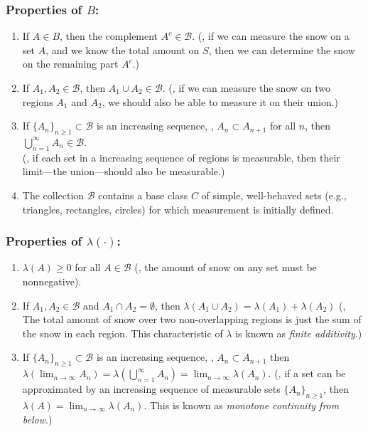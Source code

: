 \subsubsection*{Properties of $B$:}
\begin{enumerate}
    \item If $A \in B$, then the complement $A^c \in \mathcal{B}$. (\ie, if we can measure the snow on a set $A$, and we know the total amount on $S$, then we can determine the snow on the remaining part $A^c$.)
    \item If $A_1, A_2 \in \mathcal{B}$, then \(A_1 \cup A_2 \in \mathcal{B}\).  
    (\ie, if we can measure the snow on two regions \(A_1\) and \(A_2\), we should also be able to measure it on their union.)
    \item If $\{A_n\}_{n \geq 1} \subset \mathcal{B}$ is an increasing sequence, \ie, $A_n \subset A_{n+1}$ for all $n$, then $\bigcup_{n=1}^{\infty} A_n \in \mathcal{B}$.  
    \\(\ie, if each set in a increasing sequence of regions is measurable, then their limit—the union—should also be measurable.)
    \item The collection $\mathcal{B}$ contains a base class $C$ of simple, well-behaved sets (e.g., triangles, rectangles, circles) for which measurement is initially defined.
\end{enumerate}

\subsubsection*{Properties of $\lambda (\cdot)$:}
\begin{enumerate}
    \item  $\lambda(A) \geq 0$ for all $A \in \mathcal{B}$ (\ie, the amount of snow on any set must be nonnegative). 
    \item If $A_1, A_2 \in \mathcal{B}$ and $A_1 \cap A_2 = \emptyset$, then  
    $\lambda(A_1 \cup A_2) = \lambda(A_1) + \lambda(A_2)$
 (\ie, The total amount of snow over two non-overlapping regions is just the sum of the snow in each region. This characteristic of 
$\lambda$ is known as \emph{finite additivity}.)
    \item If $\{A_n\}_{n \geq 1} \subset \mathcal{B}$ is an increasing sequence, \ie, $A_n \subset A_{n+1}$ then  
    $
    \lambda( \lim_{n \to \infty} A_n) = \lambda\left( \bigcup_{n=1}^\infty A_n \right) = \lim_{n \to \infty} \lambda(A_n).
    $
    (\ie, if a set can be approximated by an increasing sequence of measurable sets $\{A_n\}_{n \geq 1}$, then $\lambda(A) = \lim_{n \to \infty} \lambda(A_n)$. This is known as \emph{monotone continuity from below}.)
\end{enumerate}

